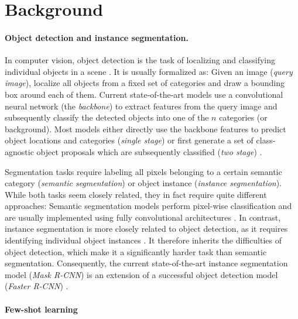 \documentclass{article}
\begin{document}
\section{Background}

\paragraph{Object detection and instance segmentation.}

In computer vision, object detection is the task of localizing and classifying individual objects in a scene \cite{Everingham2010}. It is usually formalized as: Given an image (\emph{query image}), localize all objects from a fixed set of categories and draw a bounding box around each of them. Current state-of-the-art models use a convolutional neural network (the \emph{backbone}) to extract features from the query image and subsequently classify the detected objects into one of the $n$ categories (or background). Most models either directly use the backbone features to predict object locations and categories (\emph{single stage}) \cite{Liu2016, Redmon2016, Redmon2017, Redmon2018, Lin2017b} or first generate a set of class-agnostic object proposals which are subsequently classified (\emph{two stage}) \cite{Girshick2014, Girshick2015, Ren2015, He2017}.

Segmentation tasks require labeling all pixels belonging to a certain semantic category (\emph{semantic segmentation}) or object instance (\emph{instance segmentation}). While both tasks seem closely related, they in fact require quite different approaches: Semantic segmentation models perform pixel-wise classification and are usually implemented using fully convolutional architectures \cite{Long2015, Noh2015, Ronneberger2015, Zhao2017, Chen2018b}.
In contrast, instance segmentation is more closely related to object detection, as it requires identifying individual object instances \cite{Hariharan2014, Dai2015, Pinheiro2015, Ren2017, He2017}. It therefore inherits the difficulties of object detection, which make it a significantly harder task than semantic segmentation. Consequently, the current state-of-the-art instance segmentation model (\emph{Mask R-CNN}) \cite{He2017} is an extension of a successful object detection model (\emph{Faster R-CNN}) \cite{Ren2015}.

\paragraph{Few-shot learning}
\end{document}
